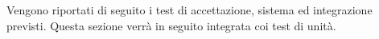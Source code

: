 	Vengono riportati di seguito i test di accettazione, sistema ed integrazione previsti. Questa sezione verrà in seguito integrata coi test di unità.
	
	
